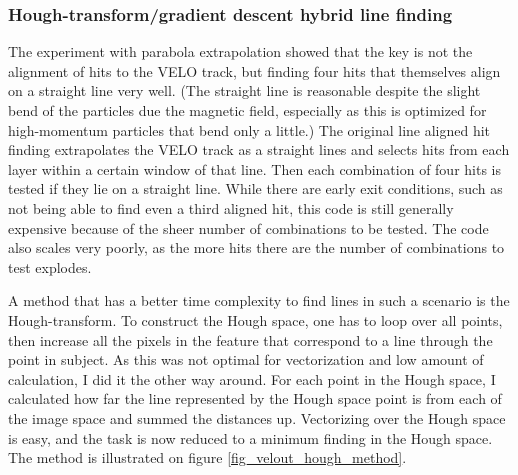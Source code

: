 \documentclass[12pt]{article}
\begin{document}
\subsubsection{Hough-transform/gradient descent hybrid line finding}

The experiment with parabola extrapolation showed that the key is not the alignment of hits to the VELO track, but finding four hits that themselves align on a straight line very well. (The straight line is reasonable despite the slight bend of the particles due the magnetic field, especially as this is optimized for high-momentum particles that bend only a little.) The original line aligned hit finding extrapolates the VELO track as a straight lines and selects hits from each layer within a certain window of that line. Then each combination of four hits is tested if they lie on a straight line. While there are early exit conditions, such as not being able to find even a third aligned hit, this code is still generally expensive because of the sheer number of combinations to be tested. The code also scales very poorly, as the more hits there are the number of combinations to test explodes.
\vspace{1pc}

A method that has a better time complexity to find lines in such a scenario is the Hough-transform\cite{wiki_hough_transform}. To construct the Hough space, one has to loop over all points, then increase all the pixels in the feature that correspond to a line through the point in subject. As this was not optimal for vectorization and low amount of calculation, I did it the other way around. For each point in the Hough space, I calculated how far the line represented by the Hough space point is from each of the image space and summed the distances up. Vectorizing over the Hough space is easy, and the task is now reduced to a minimum finding in the Hough space. The method is illustrated on figure \ref{fig_velout_hough_method}.
\end{document}
